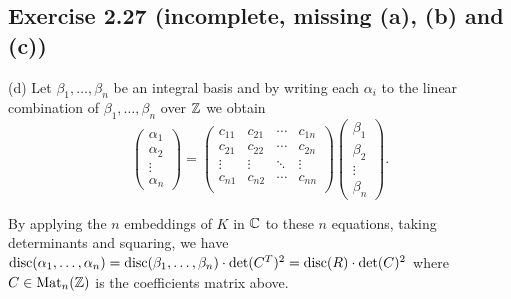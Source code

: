 \documentclass[../Marcus.tex]{subfiles}
\begin{document}
\subsection*{Exercise 2.27 \color{red}(incomplete, missing (a), (b) and (c))}

\begin{comment}
(a) It's enough to show that $G/H$ is a torsion $\ZZ$-module. (Then by the fundamental theorem of finitely generated abelian groups, $G/H$ is finite.) Suppose not, then there exists $g\in G$ s.t. $mg \notin H$ for all $m\in \ZZ \setminus\{0\}$. Write $H = \oplus_{i=1}^n \ZZ h_i$. We check that $\{g,h_1,\ldots,h_n\}$ is linearly independent over $\ZZ$. Suppose $m_0g + \sum_{i=1}^n m_ih_i = 0$ for some $m_i\in \ZZ$. Then since $m_0g \in H$, we must have $m_0 = 0$. And so $m_1=\cdots=m_n=0$. This completes the claim. Consequently, $H \oplus \ZZ g = ( \oplus_{i=1}^n \ZZ h_i ) \oplus \ZZ g \sbe G$ is of rank $n+1$, a contradiction.
\end{comment}

(d) Let $\beta_1,\ldots,\beta_n$ be an integral basis and by writing each $\alpha_i$ to the linear combination of $\beta_1,\ldots,\beta_n$ over $\mathbb{Z}$ we obtain
$$
\begin{pmatrix}
    \alpha_1  \\
    \alpha_2 \\
    \vdots \\
    \alpha_n
\end{pmatrix}
=
\begin{pmatrix}
    c_{11}  & c_{21} & \cdots & c_{1n} \\
    c_{21} & c_{22} & \cdots & c_{2n} \\
    \vdots & \vdots  & \ddots & \vdots \\
    c_{n1} & c_{n2} & \cdots & c_{nn} \\
\end{pmatrix}
\begin{pmatrix}
    \beta_1 \\
    \beta_2 \\
    \vdots \\
    \beta_n
\end{pmatrix}.
$$

By applying the $n$ embeddings of $K$ in $\mathbb{C}$ to these $n$ equations, taking determinants and squaring, we have $\operatorname{disc}(\alpha_1,\ldots,\alpha_n)=\operatorname{disc}(\beta_1,\ldots,\beta_n)\cdot \det(C^T)^2=\operatorname{disc}(R)\cdot \det(C)^2$ where $C\in\operatorname{Mat}_n(\mathbb{Z})$ is the coefficients matrix above.
\end{document}
